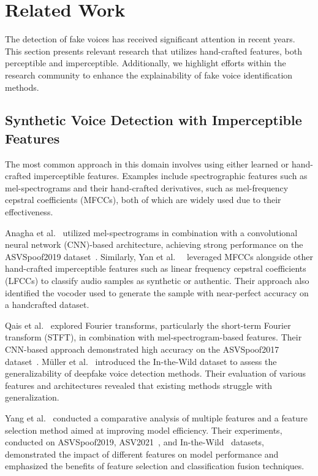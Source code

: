 \documentclass{article}
\begin{document}
\section{Related Work} \label{sec:related}

The detection of fake voices has received significant attention in recent years. This section presents relevant research that utilizes hand-crafted features, both perceptible and imperceptible. Additionally, we highlight efforts within the research community to enhance the explainability of fake voice identification methods.

\subsection{Synthetic Voice Detection with Imperceptible Features} \label{sec:related_imperceptible}

The most common approach in this domain involves using either learned or hand-crafted imperceptible features. Examples include spectrographic features such as mel-spectrograms and their hand-crafted derivatives, such as mel-frequency cepstral coefficients (MFCCs), both of which are widely used due to their effectiveness.

Anagha et al.~\cite{anagha_audio_2023} utilized mel-spectrograms in combination with a convolutional neural network (CNN)-based architecture, achieving strong performance on the ASVSpoof2019 dataset~\cite{wang_asvspoof_2020}. Similarly, Yan et al.~~\cite{yan_initial_2022} leveraged MFCCs alongside other hand-crafted imperceptible features such as linear frequency cepstral coefficients (LFCCs) to classify audio samples as synthetic or authentic. Their approach also identified the vocoder used to generate the sample with near-perfect accuracy on a handcrafted dataset.

\sloppy
Qais et al.~\cite{qais_deepfake_2022} explored Fourier transforms, particularly the short-term Fourier transform (STFT), in combination with mel-spectrogram-based features. Their CNN-based approach demonstrated high accuracy on the ASVSpoof2017 dataset~\cite{delgado_asvspoof_2018}. Müller et al.~\cite{muller_does_2022} introduced the In-the-Wild dataset to assess the generalizability of deepfake voice detection methods. Their evaluation of various features and architectures revealed that existing methods struggle with generalization.

Yang et al.~\cite{yang_robust_2024} conducted a comparative analysis of multiple features and a feature selection method aimed at improving model efficiency. Their experiments, conducted on ASVSpoof2019\cite{wang_asvspoof_2020}, ASV2021~\cite{liu_asvspoof_2023}, and In-the-Wild~\cite{muller_does_2022} datasets, demonstrated the impact of different features on model performance and emphasized the benefits of feature selection and classification fusion techniques.
\end{document}
